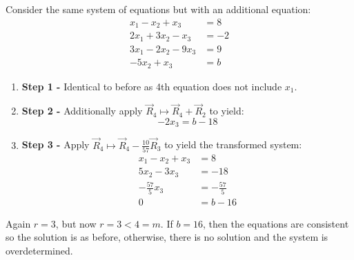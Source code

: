 \documentclass[../main.tex]{subfiles}
\begin{document}
\begin{example}
  Consider the same system of equations but with an additional equation:
  \begin{align*}
    x_1 - x_2 + x_3 &= 8 \\
    2x_1 + 3x_2 - x_3 &= -2 \\
    3x_1 - 2x_2 - 9x_3 &= 9 \\
    - 5x_2 + x_3 &= b
  \end{align*}
  \begin{enumerate}
    \item \textbf{Step 1 -} Identical to before as 4th equation does not include $x_1$.
    \item \textbf{Step 2 -} Additionally apply $\vec{R}_4 \mapsto \vec{R}_4 + \vec{R}_2$ to yield:
      \[
        -2x_3 = b - 18
      \]
    \item \textbf{Step 3 -} Apply $\vec{R}_4 \mapsto \vec{R}_4 - \frac{10}{57}\vec{R}_3$ to yield the transformed system:
      \begin{align*}
        x_1 - x_2 + x_3 &= 8 \\
        5x_2 - 3x_3 &= -18 \\
        -\frac{57}{5}x_3 &= -\frac{57}{5} \\
        0 &= b - 16
      \end{align*}
  \end{enumerate}
  Again $r = 3$, but now $r = 3 < 4 = m$.
  If $b = 16$, then the equations are consistent so the solution is as before, otherwise, there is no solution and the system is overdetermined.
\end{example}
\end{document}
